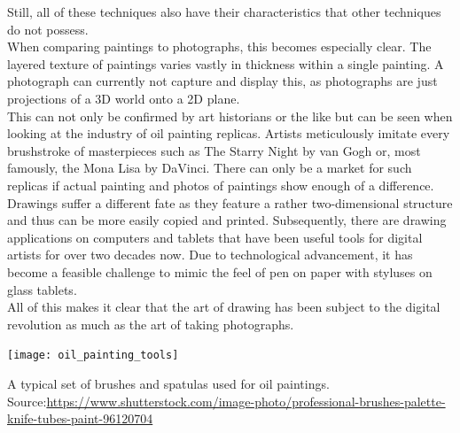 Still, all of these techniques also have their characteristics that other techniques do not possess. \\
When comparing paintings to photographs, this becomes especially clear.
The layered texture of paintings varies vastly in thickness within a single painting.
A photograph can currently not capture and display this, as photographs are just projections of a 3D world onto a 2D plane.\\
This can not only be confirmed by art historians or the like but can be seen when looking at the industry of oil painting replicas.
Artists meticulously imitate every brushstroke of masterpieces such as The Starry Night by van Gogh or, most famously, the Mona Lisa by DaVinci.
There can only be a market for such replicas if actual painting and photos of paintings show enough of a difference.\\
Drawings suffer a different fate as they feature a rather two-dimensional structure and thus can be more easily copied and printed.
Subsequently, there are drawing applications on computers and tablets that have been useful tools for digital artists for over two decades now.
Due to technological advancement, it has become a feasible challenge to mimic the feel of pen on paper with styluses on glass tablets.\\
All of this makes it clear that the art of drawing has been subject to the digital revolution as much as the art of taking photographs.
\begin{marginfigure}
    \texttt{[image: oil\_painting\_tools]}
    \caption[]{A typical set of brushes and spatulas used for oil paintings. Source:\url{https://www.shutterstock.com/image-photo/professional-brushes-palette-knife-tubes-paint-96120704}}
\end{marginfigure}


